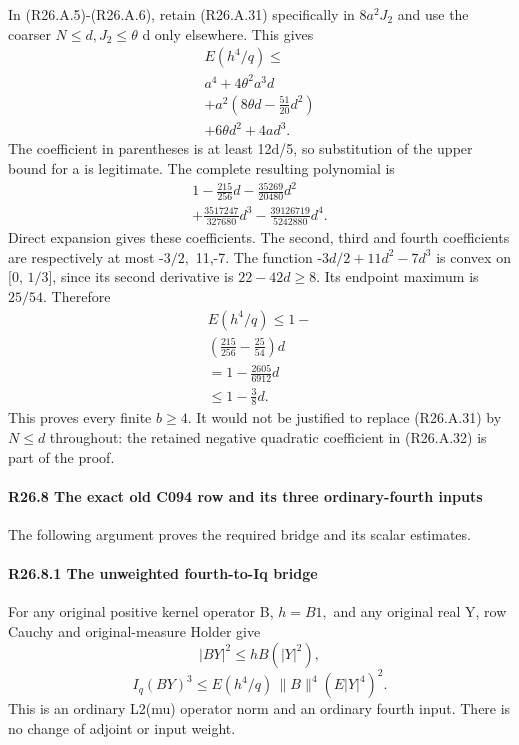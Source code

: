 In (R26.A.5)-(R26.A.6), retain (R26.A.31) specifically in \(8a^2J_2\) and use the
coarser \(N\le d,\allowbreak  J_2\le \theta\) d only elsewhere. This gives
\[
\begin{gathered}
E(h^4/q)\le\\
a^4+4\theta^2a^3d\\
+a^2\left(8\theta d-\frac{51}{20}d^2\right)\\
+6\theta d^2+4ad^3.
\end{gathered}\tag{R26.A.32}
\]
The coefficient in parentheses is at least 12d/5, so substitution of
the upper bound for a is legitimate. The complete resulting polynomial is
\[
\begin{gathered}
1-\frac{215}{256}d-\frac{35269}{20480}d^2\\
+\frac{3517247}{327680}d^3-\frac{39126719}{5242880}d^4.
\end{gathered}
\]
Direct expansion gives these coefficients. The second, third and fourth
coefficients are respectively at most -\(3/2,\allowbreak \) 11,-7.
The function -\(3d/2+11d^2-7d^3\) is convex on [0, \(1/3\)], since its second
derivative is \(22-42d\ge 8.\) Its endpoint maximum is \(25/54.\) Therefore
\[
\begin{gathered}
E(h^4/q)\le1-\\
\left(\frac{215}{256}-\frac{25}{54}\right)d\\
=1-\frac{2605}{6912}d\\
\le1-\frac38d.
\end{gathered}
\]
This proves every finite \(b\ge 4.\) It would not be justified to replace
(R26.A.31) by \(N\le d\) throughout: the retained negative quadratic coefficient
in (R26.A.32) is part of the proof.

\paragraph{R26.8 The exact old C094 row and its three ordinary-fourth inputs}

The following argument proves the required bridge and its scalar estimates.

\paragraph{R26.8.1 The unweighted fourth-to-Iq bridge}

For any original positive kernel operator B, \(h=B1,\allowbreak \) and any original real
Y, row Cauchy and original-measure Holder give
\[
|BY|^2\le hB(|Y|^2),
\]
\[
I_q(BY)^3
\le E(h^4/q)\,\|B\|^4(E|Y|^4)^2.                \tag{R26.A.33}
\]
This is an ordinary L2(mu) operator norm and an ordinary fourth input.
There is no change of adjoint or input weight.

